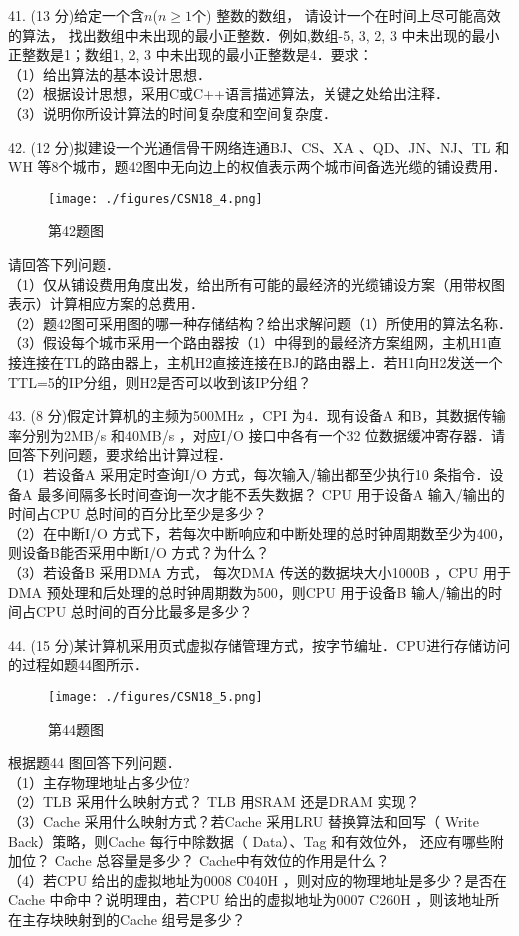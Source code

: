 41. (13 分)给定一个含$n$($n\geqslant1$个) 整数的数组， 请设计一个在时间上尽可能高效的算法， 找出数组中未出现的最小正整数．例如,数组{-5, 3, 2, 3} 中未出现的最小正整数是1；数组{1, 2, 3} 中未出现的最小正整数是4．要求： \\
（1）给出算法的基本设计思想． \\
（2）根据设计思想，采用C或C++语言描述算法，关键之处给出注释． \\
（3）说明你所设计算法的时间复杂度和空间复杂度．

42. (12 分)拟建设一个光通信骨干网络连通BJ、CS、XA 、QD、JN、NJ、TL 和WH 等8个城市，题42图中无向边上的权值表示两个城市间备选光缆的铺设费用．
\begin{figure}[ht]
\centering
\texttt{[image: ./figures/CSN18\_4.png]}
\caption{第42题图} \label{CSN18_fig4}
\end{figure}
请回答下列问题． \\
（1）仅从铺设费用角度出发，给出所有可能的最经济的光缆铺设方案（用带权图表示）计算相应方案的总费用． \\
（2）题42图可采用图的哪一种存储结构？给出求解问题（1）所使用的算法名称． \\
（3）假设每个城市采用一个路由器按（1）中得到的最经济方案组网，主机H1直接连接在TL的路由器上，主机H2直接连接在BJ的路由器上．若H1向H2发送一个TTL=5的IP分组，则H2是否可以收到该IP分组？

43. (8 分)假定计算机的主频为500MHz ，CPI 为4．现有设备A 和B，其数据传输率分别为2MB/s 和40MB/s ，对应I/O 接口中各有一个32 位数据缓冲寄存器．请回答下列问题，要求给出计算过程． \\
（1）若设备A 采用定时查询I/O 方式，每次输入/输出都至少执行10 条指令．设备A 最多间隔多长时间查询一次才能不丢失数据？ CPU 用于设备A 输入/输出的时间占CPU 总时间的百分比至少是多少？  \\
（2）在中断I/O 方式下，若每次中断响应和中断处理的总时钟周期数至少为400，则设备B能否采用中断I/O 方式？为什么？ \\
（3）若设备B 采用DMA 方式， 每次DMA 传送的数据块大小1000B ，CPU 用于DMA 预处理和后处理的总时钟周期数为500，则CPU 用于设备B 输人/输出的时间占CPU 总时间的百分比最多是多少？

44. (15 分)某计算机采用页式虚拟存储管理方式，按字节编址．CPU进行存储访问的过程如题44图所示．
\begin{figure}[ht]
\centering
\texttt{[image: ./figures/CSN18\_5.png]}
\caption{第44题图} \label{CSN18_fig5}
\end{figure}
根据题44 图回答下列问题． \\
（1）主存物理地址占多少位? \\
（2）TLB 采用什么映射方式？ TLB 用SRAM 还是DRAM 实现？ \\
（3）Cache 采用什么映射方式？若Cache 采用LRU 替换算法和回写（ Write Back）策略，则Cache 每行中除数据（ Data）、Tag 和有效位外， 还应有哪些附加位？ Cache 总容量是多少？ Cache中有效位的作用是什么？ \\
（4）若CPU 给出的虚拟地址为0008 C040H ，则对应的物理地址是多少？是否在Cache 中命中？说明理由，若CPU 给出的虚拟地址为0007 C260H ，则该地址所在主存块映射到的Cache 组号是多少？

